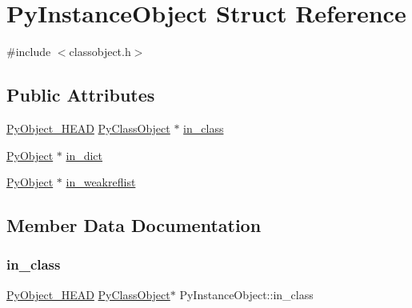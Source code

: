 \hypertarget{struct_py_instance_object}{}\section{Py\+Instance\+Object Struct Reference}
\label{struct_py_instance_object}


{\ttfamily \#include $<$classobject.\+h$>$}

\subsection*{Public Attributes}
\begin{DoxyCompactItemize}
\item 
\mbox{\hyperlink{_python27_2object_8h_a0bf35c1f3ea13f925de94d8593db3b7e}{Py\+Object\+\_\+\+H\+E\+AD}} \mbox{\hyperlink{struct_py_class_object}{Py\+Class\+Object}} $\ast$ \mbox{\hyperlink{struct_py_instance_object_a6c55822cadd340367810c20eac45e6bd}{in\+\_\+class}}
\item 
\mbox{\hyperlink{_python27_2object_8h_aadc84ac7aed2cfa6f20c25f62bf3dac7}{Py\+Object}} $\ast$ \mbox{\hyperlink{struct_py_instance_object_a975ee7e3ec12b936d7774ef38c41eec7}{in\+\_\+dict}}
\item 
\mbox{\hyperlink{_python27_2object_8h_aadc84ac7aed2cfa6f20c25f62bf3dac7}{Py\+Object}} $\ast$ \mbox{\hyperlink{struct_py_instance_object_ab2da032abfb9112c0b0021afc739a6ef}{in\+\_\+weakreflist}}
\end{DoxyCompactItemize}


\subsection{Member Data Documentation}
\mbox{\label{struct_py_instance_object_a6c55822cadd340367810c20eac45e6bd}} 
\subsubsection{\texorpdfstring{in\_class}{in\_class}}
{\footnotesize\ttfamily \mbox{\hyperlink{_python27_2object_8h_a0bf35c1f3ea13f925de94d8593db3b7e}{Py\+Object\+\_\+\+H\+E\+AD}} \mbox{\hyperlink{struct_py_class_object}{Py\+Class\+Object}}$\ast$ Py\+Instance\+Object\+::in\+\_\+class}

\mbox{\label{struct_py_instance_object_a975ee7e3ec12b936d7774ef38c41eec7}} 
